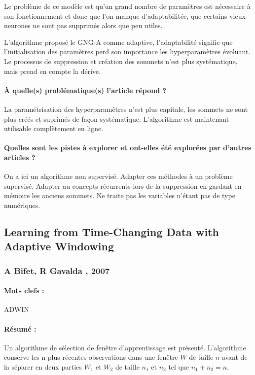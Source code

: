 \documentclass[11pt,a4paper]{report}
\begin{document}
Le problème de ce modèle est qu'un grand nombre de paramètres est nécessaire à son fonctionnement et donc que l'on manque d'adaptabilitée, que certains vieux neurones ne sont pas supprimés alors que peu utiles.

L'algorithme proposé le GNG-A comme adaptive, l'adaptabilité signifie que l'initialisation des paramètres perd son importance les hyperparamètres évoluant. Le processus de suppression et création des sommets n'est plus systématique, mais prend en compte la dérive. 

\paragraph{À quelle(s) problématique(s) l'article répond ? } La paramétrisation des hyperparamètres n'est plus capitale, les sommets ne sont plus créés et suprimés de façon systématique. L'algorithme est maintenant utilisable complètement en ligne.

\paragraph{Quelles sont les pistes à explorer et ont-elles  été explorées par d'autres articles ? } On a ici un algorithme non supervisé. Adapter ces méthodes à un problème supervisé. Adapter au concepts récurrents lors de la suppression en gardant en mémoire les anciens sommets. Ne traite pas les variables n'étant pas de type numériques.



\subsection{Learning from Time-Changing Data with Adaptive Windowing}
\subsubsection{A Bifet, R Gavalda , 2007}


\paragraph{Mots clefs :} ADWIN

\paragraph{Résumé :} Un algorithme de sélection de fenêtre d’apprentissage est présenté. L’algorithme conserve les n plus récentes observations dans une fenêtre $W$ de taille $n$ avant de la séparer en deux parties $W_1$ et $W_2$ de taille $n_1$ et $n_2$ tel que $n_1+n_2=n$. 
\end{document}
